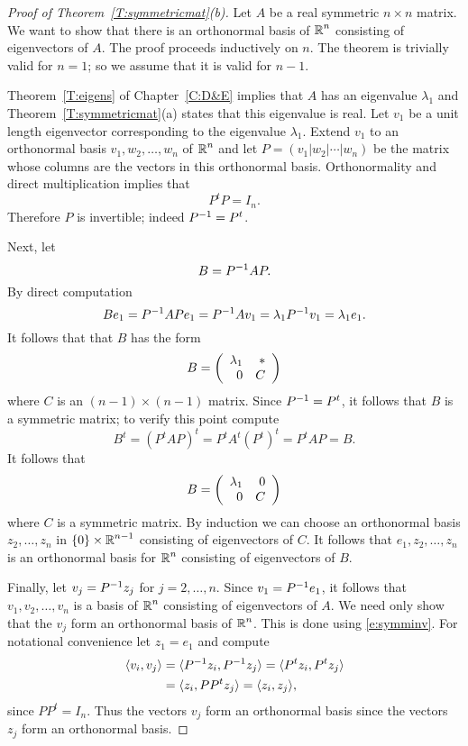 \documentclass{ximera}
\begin{document}
\begin{proof}[Proof of Theorem~\ref{T:symmetricmat}(b)]
Let $A$ be a real symmetric $n\times n$ matrix.  We want to show that there
is an orthonormal basis of $\mbox{$\Bbb{R}$}^n$ consisting of eigenvectors of $A$.  The
proof proceeds inductively on $n$.   The theorem is trivially valid for
$n=1$; so we assume that it is valid for $n-1$.

Theorem~\ref{T:eigens} of Chapter~\ref{C:D&E} implies that $A$ has an 
eigenvalue $\lambda_1$ and Theorem~\ref{T:symmetricmat}(a) states that 
this eigenvalue is real.
Let $v_1$ be a unit length eigenvector corresponding to the eigenvalue
$\lambda_1$.  Extend $v_1$ to an orthonormal basis $v_1,w_2,\ldots,w_n$ of
$\mbox{$\Bbb{R}$}^n$ and let $P=(v_1|w_2|\cdots|w_n)$ be the matrix whose columns are the
vectors in this orthonormal basis.  Orthonormality and direct multiplication
implies that
\begin{equation}  \label{e:orthosym}
P^tP=I_n.
\end{equation}
Therefore $P$ is invertible; indeed $P^{-1}=P^t$.

Next, let
\[
B= P^{-1} AP.
\]
By direct computation
\[
Be_1 = P^{-1} APe_1 = P^{-1} Av_1 = \lambda_1 P^{-1} v_1=\lambda_1e_1.
\]
It follows that that $B$ has the form
\[
B = \left(\begin{array}{rr} \lambda_1 & *\\ 0 &C\end{array}\right)
\]
where $C$ is an $(n-1)\times (n-1)$ matrix.   Since $P^{-1}=P^t$, it follows
that $B$ is a symmetric matrix; to verify this point compute
\[
B^t = (P^t AP)^t = P^t A^t (P^t)^t = P^tAP = B.
\]
It follows that
\[
B =\left(\begin{array}{rr} \lambda_1 & 0\\ 0 &C\end{array}\right)
\]
where $C$ is a symmetric matrix.  By induction we can choose an orthonormal
basis $z_2,\ldots,z_n$ in $\{0\}\times\mbox{$\Bbb{R}$}^{n-1}$ consisting of eigenvectors
of $C$.  It follows that $e_1,z_2,\ldots,z_n$ is an orthonormal basis for
$\mbox{$\Bbb{R}$}^n$ consisting of eigenvectors of $B$.

Finally, let $v_j=P^{-1} z_j$ for $j=2,\ldots,n$.  Since $v_1=P^{-1} e_1$,
it follows that  $v_1,v_2,\ldots,v_n$ is a basis of $\mbox{$\Bbb{R}$}^n$ consisting of
eigenvectors of $A$.  We need only show that the $v_j$ form an orthonormal
basis of $\mbox{$\Bbb{R}$}^n$.   This is done using \eqref{e:symminv}.  For notational
convenience let $z_1=e_1$ and compute
\begin{align*}
\langle v_i,v_j \rangle  &=\langle P^{-1} z_i,P^{-1} z_j\rangle =
                           \langle P^tz_i, P^tz_j \rangle \\
  &= \langle z_i, PP^t z_j \rangle =
\langle z_i,z_j \rangle,
\end{align*}
since $PP^t= I_n$.  Thus the vectors $v_j$ form an orthonormal basis since
the vectors $z_j$ form an orthonormal basis.  \end{proof}
\end{document}
